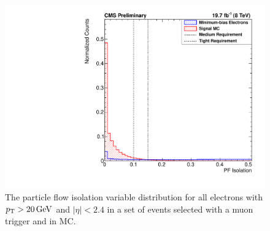 \begin{figure}[!htbp]
    \centering
    \includegraphics[width=\StackedPlotWidth]{figures/e_reco_var_iso.pdf}
    \caption[
        Distributions of particle flow isolation variables in data and MC.
    ]{
        The particle flow isolation variable distribution for all electrons
        with $p_{\mathrm{T}} > 20 \,\text{Ge\hspace{-.08em}V}$ and $|\eta| < 2.4$ in a set of events selected
        with a muon trigger and in \MADGRAPH \Ztoee MC.
    }
    \label{fig:pf_iso}
\end{figure}
